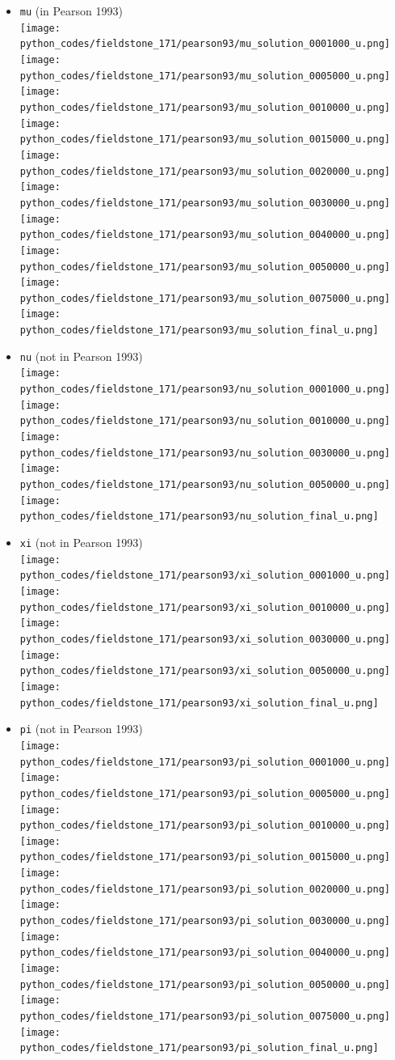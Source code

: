\begin{itemize}
\item {\tt mu} (in Pearson 1993)\\
\texttt{[image: python\_codes/fieldstone\_171/pearson93/mu\_solution\_0001000\_u.png]}
\texttt{[image: python\_codes/fieldstone\_171/pearson93/mu\_solution\_0005000\_u.png]}
\texttt{[image: python\_codes/fieldstone\_171/pearson93/mu\_solution\_0010000\_u.png]}
\texttt{[image: python\_codes/fieldstone\_171/pearson93/mu\_solution\_0015000\_u.png]}
\texttt{[image: python\_codes/fieldstone\_171/pearson93/mu\_solution\_0020000\_u.png]}
\texttt{[image: python\_codes/fieldstone\_171/pearson93/mu\_solution\_0030000\_u.png]}
\texttt{[image: python\_codes/fieldstone\_171/pearson93/mu\_solution\_0040000\_u.png]}
\texttt{[image: python\_codes/fieldstone\_171/pearson93/mu\_solution\_0050000\_u.png]}
\texttt{[image: python\_codes/fieldstone\_171/pearson93/mu\_solution\_0075000\_u.png]}
\texttt{[image: python\_codes/fieldstone\_171/pearson93/mu\_solution\_final\_u.png]}

\item {\tt nu} (not in Pearson 1993)\\
\texttt{[image: python\_codes/fieldstone\_171/pearson93/nu\_solution\_0001000\_u.png]}
\texttt{[image: python\_codes/fieldstone\_171/pearson93/nu\_solution\_0010000\_u.png]}
\texttt{[image: python\_codes/fieldstone\_171/pearson93/nu\_solution\_0030000\_u.png]}
\texttt{[image: python\_codes/fieldstone\_171/pearson93/nu\_solution\_0050000\_u.png]}
\texttt{[image: python\_codes/fieldstone\_171/pearson93/nu\_solution\_final\_u.png]}

\item {\tt xi} (not in Pearson 1993)\\
\texttt{[image: python\_codes/fieldstone\_171/pearson93/xi\_solution\_0001000\_u.png]}
\texttt{[image: python\_codes/fieldstone\_171/pearson93/xi\_solution\_0010000\_u.png]}
\texttt{[image: python\_codes/fieldstone\_171/pearson93/xi\_solution\_0030000\_u.png]}
\texttt{[image: python\_codes/fieldstone\_171/pearson93/xi\_solution\_0050000\_u.png]}
\texttt{[image: python\_codes/fieldstone\_171/pearson93/xi\_solution\_final\_u.png]}

\item {\tt pi} (not in Pearson 1993)\\
\texttt{[image: python\_codes/fieldstone\_171/pearson93/pi\_solution\_0001000\_u.png]}
\texttt{[image: python\_codes/fieldstone\_171/pearson93/pi\_solution\_0005000\_u.png]}
\texttt{[image: python\_codes/fieldstone\_171/pearson93/pi\_solution\_0010000\_u.png]}
\texttt{[image: python\_codes/fieldstone\_171/pearson93/pi\_solution\_0015000\_u.png]}
\texttt{[image: python\_codes/fieldstone\_171/pearson93/pi\_solution\_0020000\_u.png]}
\texttt{[image: python\_codes/fieldstone\_171/pearson93/pi\_solution\_0030000\_u.png]}
\texttt{[image: python\_codes/fieldstone\_171/pearson93/pi\_solution\_0040000\_u.png]}
\texttt{[image: python\_codes/fieldstone\_171/pearson93/pi\_solution\_0050000\_u.png]}
\texttt{[image: python\_codes/fieldstone\_171/pearson93/pi\_solution\_0075000\_u.png]}
\texttt{[image: python\_codes/fieldstone\_171/pearson93/pi\_solution\_final\_u.png]}


\end{itemize}
